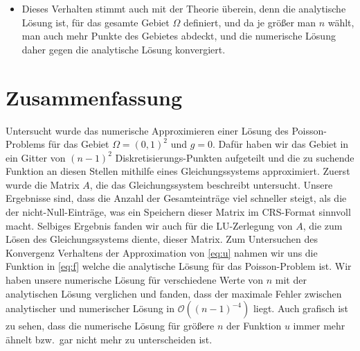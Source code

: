 \documentclass{scrartcl}
\newcommand\BigO{\mathcal{O}}
\begin{document}
\begin{itemize}
    \item Dieses Verhalten stimmt auch mit der Theorie überein, denn die
          analytische Lösung ist, für das gesamte Gebiet \(\Omega\) definiert,
          und da je größer man \(n\) wählt, man auch mehr Punkte des Gebietes
          abdeckt, und die numerische Lösung daher gegen die analytische Lösung
          konvergiert.
\end{itemize}

\section{Zusammenfassung}

Untersucht wurde das numerische Approximieren einer Lösung des Poisson-Problems
für das Gebiet \(\Omega = {(0, 1)}^2\) und \(g = 0\). Dafür haben wir das
Gebiet in ein Gitter von \({(n - 1)}^2\) Diskretisierungs-Punkten aufgeteilt
und die zu suchende Funktion an diesen Stellen mithilfe eines Gleichungssystems
approximiert. Zuerst wurde die Matrix \(A\), die das Gleichungssystem
beschreibt untersucht. Unsere Ergebnisse sind, dass die Anzahl der
Gesamteinträge viel schneller steigt, als die der nicht-Null-Einträge, was ein
Speichern dieser Matrix im CRS-Format sinnvoll macht. Selbiges Ergebnis fanden
wir auch für die LU-Zerlegung von \(A\), die zum Lösen des Gleichungssystems
diente, dieser Matrix. Zum Untersuchen des Konvergenz Verhaltens der
Approximation von \autoref{eq:u} nahmen wir uns die Funktion in \autoref{eq:f}
welche die analytische Lösung für das Poisson-Problem ist. Wir haben unsere
numerische Lösung für verschiedene Werte von \(n\) mit der analytischen Lösung
verglichen und fanden, dass der maximale Fehler zwischen analytischer und
numerischer Lösung in \(\BigO({(n - 1)}^{-4})\) liegt. Auch grafisch ist zu
sehen, dass die numerische Lösung für größere \(n\) der Funktion \(u\) immer
mehr ähnelt bzw.\ gar nicht mehr zu unterscheiden ist.

\printbibliography%
\end{document}
